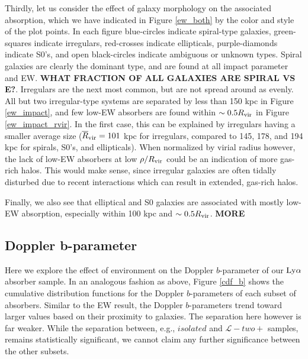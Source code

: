 \documentclass[twocolumn,tighten]{aastex62}
\begin{document}
Thirdly, let us consider the effect of galaxy morphology on the associated absorption, which we have indicated in Figure \ref{ew_both} by the color and style of the plot points. In each figure blue-circles indicate spiral-type galaxies, green-squares indicate irregulars, red-crosses indicate ellipticals, purple-diamonds indicate S0's, and open black-circles indicate ambiguous or unknown types. Spiral galaxies are clearly the dominant type, and are found at all impact parameter and EW. \textbf{WHAT FRACTION OF ALL GALAXIES ARE SPIRAL VS E?}. Irregulars are the next most common, but are not spread around as evenly. All but two irregular-type systems are separated by less than 150 kpc in Figure \ref{ew_impact}, and few low-EW absorbers are found within $\sim 0.5 R_{\rm vir}$ in Figure \ref{ew_impact_rvir}. In the first case, this can be explained by irregulars having a smaller average size ($\overline{R}_{\rm vir} = 101$ kpc for irregulars, compared to 145, 178, and 194 kpc for spirals, S0's, and ellipticals). When normalized by virial radius however, the lack of low-EW absorbers at low $\rho / R_{\rm vir}$ could be an indication of more gas-rich halos. This would make sense, since irregular galaxies are often tidally disturbed due to recent interactions which can result in extended, gas-rich halos.

Finally, we also see that elliptical and S0 galaxies are associated with mostly low-EW absorption, especially within 100 kpc and $\sim 0.5 R_{\rm vir}$. \textbf{MORE}



\subsection{Doppler b-parameter}

Here we explore the effect of environment on the Doppler $b$-parameter of our $\rm Ly\alpha$ absorber sample. In an analogous fashion as above, Figure \ref{cdf_b} shows the cumulative distribution functions for the Doppler $b$-parameters of each subset of absorbers. Similar to the EW result, the Doppler $b$-parameters trend toward larger values based on their proximity to galaxies. The separation here however is far weaker. While the separation between, e.g., $isolated$ and $\mathcal{L}-two+$ samples, remains statistically significant, we cannot claim any further significance between the other subsets. 
\end{document}
